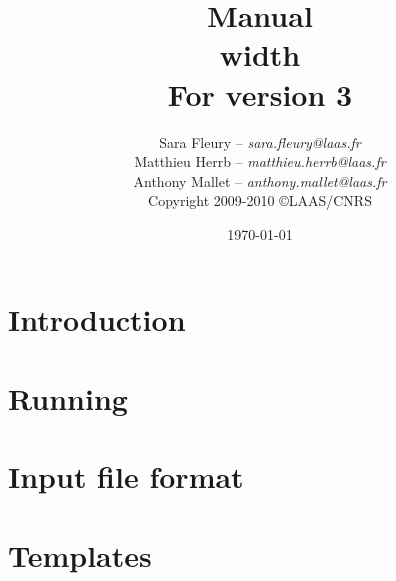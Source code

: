 \documentclass[a4paper,11pt]{book}
\title{{\Huge\bfseries \GenoM{} Manual}\\ \vrule height 2pt width \linewidth\\
         \hfill\small For \GenoM{} version 3}
\author{
   Sara Fleury -- {\em sara.fleury@laas.fr}\\
   Matthieu Herrb -- {\em matthieu.herrb@laas.fr}\\
   Anthony Mallet -- {\em anthony.mallet@laas.fr}\\[2em]
   Copyright 2009-2010 \copyright LAAS/CNRS
}
\date{\today}
\begin{document}

\frontmatter
\maketitle
\tableofcontents
\mainmatter

\chapter{Introduction}

\chapter{Running \GenoM{}}
\label{chapter:run}


\chapter{Input file format}
\label{chapter:iff}


\chapter{Templates}
\label{chapter:tmpl}
\label{section:tcl}


\backmatter

\printindex
\end{document}
